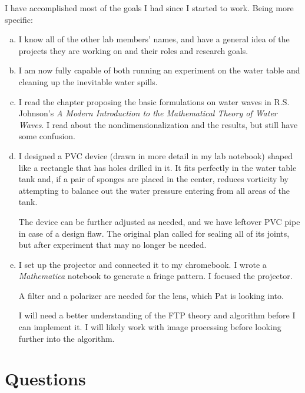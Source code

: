 \documentclass[11pt]{article}
\begin{document}
I have accomplished most of the goals I had since I started to work. Being more specific:
\begin{enumerate}[(a)]
  \item I know all of the other lab members' names, and have a general idea of the projects they are working on and their roles and research goals.

  \item I am now fully capable of both running an experiment on the water table and cleaning up the inevitable water spills.

  \item I read the chapter proposing the basic formulations on water waves in R.S. Johnson's \textit{A Modern Introduction to the Mathematical Theory of Water Waves}. I read about the nondimensionalization and the results, but still have some confusion.

  \item I designed a PVC device (drawn in more detail in my lab notebook) shaped like a rectangle that has holes drilled in it. It fits perfectly in the water table tank and, if a pair of sponges are placed in the center, reduces vorticity by attempting to balance out the water pressure entering from all areas of the tank.

  The device can be further adjusted as needed, and we have leftover PVC pipe in case of a design flaw. The original plan called for sealing all of its joints, but after experiment that may no longer be needed.

  \item I set up the projector and connected it to my chromebook. I wrote a \textit{Mathematica} notebook to generate a fringe pattern. I focused the projector.

  A filter and a polarizer are needed for the lens, which Pat is looking into.

  I will need a better understanding of the FTP theory and algorithm before I can implement it. I will likely work with image processing before looking further into the algorithm.
\end{enumerate}

\section*{Questions}
\end{document}
